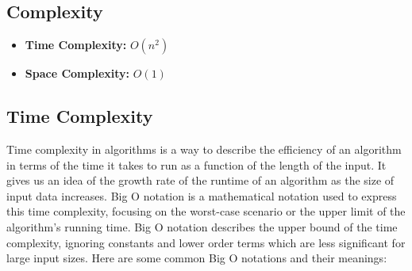 \documentclass{report}
\begin{document}
    \subsection{Complexity}
    \begin{itemize}
        \item \textbf{Time Complexity:} $O(n^{2})$
        \item \textbf{Space Complexity:} $O(1)$
    \end{itemize}
    \bigbreak \noindent

    \pagebreak 

    \pagebreak 

    \pagebreak 
    \bigbreak \noindent 
    \subsection{Time Complexity}
    \bigbreak \noindent 
    \begin{concept}
        Time complexity in algorithms is a way to describe the efficiency of an algorithm in terms of the time it takes to run as a function of the length of the input. It gives us an idea of the growth rate of the runtime of an algorithm as the size of input data increases. Big O notation is a mathematical notation used to express this time complexity, focusing on the worst-case scenario or the upper limit of the algorithm's running time.
        \bigbreak \noindent 
        Big O notation describes the upper bound of the time complexity, ignoring constants and lower order terms which are less significant for large input sizes. Here are some common Big O notations and their meanings:
    \end{concept}
    \bigbreak \noindent 
\end{document}
